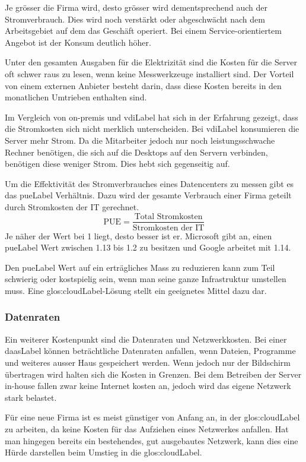Je grösser die Firma wird, desto grösser wird dementsprechend auch der Stromverbrauch. Dies wird noch verstärkt oder abgeschwächt nach dem Arbeitsgebiet auf dem das Geschäft operiert. Bei einem Service-orientiertem Angebot ist der Konsum deutlich höher.

Unter den gesamten Ausgaben für die Elektrizität sind die Kosten für die Server oft schwer raus zu lesen, wenn keine Messwerkzeuge installiert sind. Der Vorteil von einem externen Anbieter besteht darin, dass diese Kosten bereits in den monatlichen Umtrieben enthalten sind.

Im Vergleich von on-premis und \Gls{vdiLabel} hat sich in der Erfahrung gezeigt, dass die Stromkosten sich nicht merklich unterscheiden. Bei \Gls{vdiLabel} konsumieren die Server mehr Strom. Da die Mitarbeiter jedoch nur noch leistungsschwache Rechner benötigen, die sich auf die Desktops auf den Servern verbinden, benötigen diese weniger Strom. Dies hebt sich gegenseitig auf.

Um die Effektivität des Stromverbrauches eines Datencenters zu messen gibt es das \Gls{pueLabel} Verhältnis. Dazu wird der gesamte Verbrauch einer Firma geteilt durch Stromkosten der IT gerechnet.
\[\text{PUE} = \frac{\text{Total Stromkosten}}{\text{Stromkosten der IT}}\]
Je näher der Wert bei 1 liegt, desto besser ist er. Microsoft gibt an, einen \Gls{pueLabel} Wert zwischen 1.13 bis 1.2 zu besitzen und Google arbeitet mit 1.14.

Den \Gls{pueLabel} Wert auf ein erträgliches Mass zu reduzieren kann zum Teil schwierig oder kostspielig sein, wenn man seine ganze Infrastruktur umstellen muss. Eine \Gls{glos:cloudLabel}-Lösung stellt ein geeignetes Mittel dazu dar.

\subsubsection{Datenraten}
Ein weiterer Kostenpunkt sind die Datenraten und Netzwerkkosten. Bei einer \Gls{daasLabel} können beträchtliche Datenraten anfallen, wenn Dateien, Programme und weiteres ausser Haus gespeichert werden. Wenn jedoch nur der Bildschirm übertragen wird halten sich die Kosten in Grenzen. Bei dem Betreiben der Server in-house fallen zwar keine Internet kosten an, jedoch wird das eigene Netzwerk stark belastet.

Für eine neue Firma ist es meist günstiger von Anfang an, in der \Gls{glos:cloudLabel} zu arbeiten, da keine Kosten für das Aufziehen eines Netzwerkes anfallen.
Hat man hingegen bereits ein bestehendes, gut ausgebautes Netzwerk, kann dies eine Hürde darstellen beim Umstieg in die \Gls{glos:cloudLabel}.

